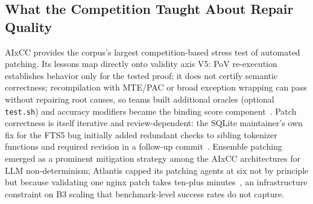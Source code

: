 \documentclass[conference,compsoc]{IEEEtran}
\begin{document}
\subsection{What the Competition Taught About Repair Quality}
AIxCC provides the corpus's largest competition-based stress test of automated patching. Its lessons
map directly onto validity axis V5: PoV re-execution establishes behavior only for the tested proof; it does not certify semantic correctness;
recompilation with MTE/PAC or broad exception wrapping can pass without repairing root causes,
so teams built additional oracles (optional \texttt{test.sh}) and accuracy modifiers became the
binding score component~\cite{taafc2025}. Patch correctness is itself iterative and review-dependent:
the SQLite maintainer's own fix for the FTS5 bug initially added redundant checks to sibling
tokenizer functions and required revision in a follow-up commit~\cite{taasc2024}. Ensemble
patching emerged as a prominent mitigation strategy among the AIxCC architectures for LLM non-determinism; Atlantis capped its
patching agents at six not by principle but because validating one nginx patch takes ten-plus
minutes~\cite{taafc2025}, an infrastructure constraint on B3 scaling that benchmark-level success
rates do not capture.
\end{document}
